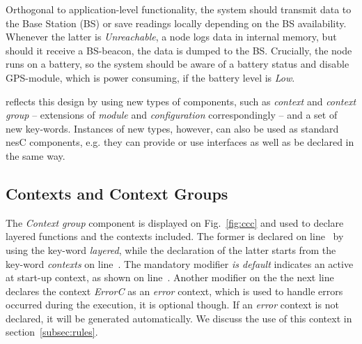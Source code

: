 Orthogonal to application-level functionality, the system should transmit data
to the Base Station (BS) or save readings locally depending on the BS
availability. Whenever the latter is \emph{Unreachable}, a node logs data in
internal memory, but should it receive a BS-beacon, the data is dumped to the
BS. Crucially, the node runs on a battery, so the system should be aware of a
battery status and disable GPS-module, which is power consuming, if the battery
level is \emph{Low}.

\conesc reflects this design by using new types of components, such as
\emph{context} and \emph{context group} -- extensions of \emph{module} and
\emph{configuration} correspondingly -- and a set of new key-words. Instances of
new types, however, can also be used as standard nesC components, e.g. they can
provide or use interfaces as well as be declared in the same way.


\subsection{Contexts and Context Groups}\label{subsec:components}

The \emph{Context group} component is displayed on Fig.~\ref{fig:ccc} and used
to declare layered functions and the contexts included. The former is declared
on line~ by using the key-word \emph{layered}, while the
declaration of the latter starts from the key-word \emph{contexts} on
line~. The mandatory modifier \emph{is default} indicates an
active at start-up context, as shown on line~. Another
modifier on the the next line~ declares the context
\emph{ErrorC} as an \emph{error} context, which is used to handle errors
occurred during the execution, it is optional though. If an \emph{error} context
is not declared, it will be generated automatically. We discuss the use of this
context in section~\ref{subsec:rules}.

